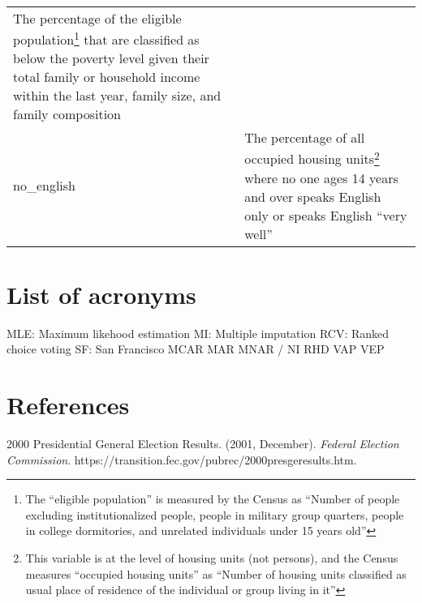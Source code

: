 \documentclass[12pt,twoside]{reedthesis}
\begin{document}
\begin{longtable}[]{@{}ll@{}}
\begin{minipage}[t]{0.50\columnwidth}
The percentage of the eligible population\footnote{The ``eligible population'' is measured by the Census as ``Number of people excluding institutionalized people, people in military group quarters, people in college dormitories, and unrelated individuals under 15 years old''} that are classified as below the poverty level given their total family or household income within the last year, family size, and family composition\strut
\end{minipage}\tabularnewline
\begin{minipage}[t]{0.44\columnwidth}\raggedright
no\_english\strut
\end{minipage} & \begin{minipage}[t]{0.50\columnwidth}\raggedright
The percentage of all occupied housing units\footnote{This variable is at the level of housing units (not persons), and the Census measures ``occupied housing units'' as ``Number of housing units classified as usual place of residence of the individual or group living in it''} where no one ages 14 years and over speaks English only or speaks English ``very well''\strut
\end{minipage}\tabularnewline
\bottomrule
\end{longtable}
\hypertarget{appendix-2}{%
\chapter{List of acronyms}\label{appendix-2}}

MLE: Maximum likehood estimation
MI: Multiple imputation
RCV: Ranked choice voting
SF: San Francisco
MCAR
MAR
MNAR / NI
RHD
VAP
VEP

\backmatter

\hypertarget{references}{%
\chapter*{References}\label{references}}


\noindent

\setlength{\parindent}{-0.20in}
\setlength{\leftskip}{0.20in}
\setlength{\parskip}{8pt}

\hypertarget{refs}{}
\leavevmode\hypertarget{ref-noauthor_2000_2001}{}%
2000 Presidential General Election Results. (2001, December). \emph{Federal Election Commission}. https://transition.fec.gov/pubrec/2000presgeresults.htm.
\end{document}
